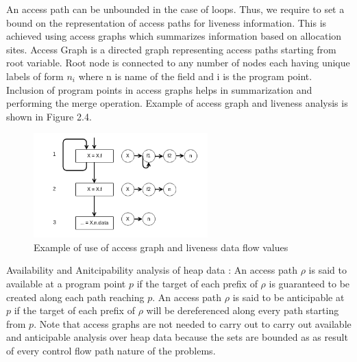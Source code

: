 An access path can be unbounded in the case of loops. Thus, we require to set a bound on the representation of access paths for liveness information. This is achieved using access graphs which summarizes information based on allocation sites. Access Graph is a directed graph representing access paths starting from root variable. Root node is connected to any number of nodes each having unique labels of form $n_i$ where n is name of the field and i is the program point. Inclusion of program points in access graphs helps in summarization and performing the merge operation.\cite{slides}
Example of access graph and liveness analysis is shown in Figure 2.4. \\

\begin{figure}
	\centering
	\includegraphics[width=0.6\textwidth]{Figures/heap_summarization_liveness.png}
	\caption{Example of use of access graph and liveness data flow values}
	\label{fig:access_graph_example}
\end{figure}

Availability and Anitcipability analysis of heap data : An access path $\rho$ is said to available at a program point $p$ if the target of each prefix of $\rho$ is guaranteed to be created along each path reaching $p$. An access path $\rho$ is said to be anticipable at $p$ if the target of each prefix of $\rho$ will be dereferenced along every path starting from $p$. Note that access graphs are not needed to carry out to carry out available and anticipable analysis over heap data because the sets are bounded as as result of every control flow path nature of the problems.     
